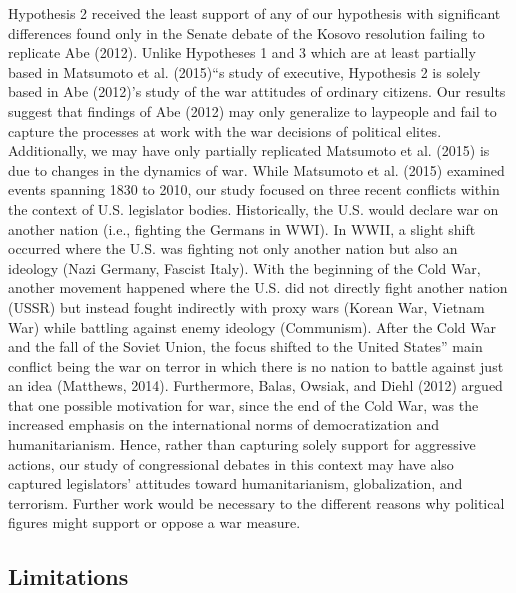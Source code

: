 \documentclass[english,,man]{apa6}
\begin{document}
Hypothesis 2 received the least support of any of our hypothesis with significant differences found only in the Senate debate of the Kosovo resolution failing to replicate Abe (2012). Unlike Hypotheses 1 and 3 which are at least partially based in Matsumoto et al. (2015)\enquote{s study of executive, Hypothesis 2 is solely based in Abe (2012)'s study of the war attitudes of ordinary citizens. Our results suggest that findings of Abe (2012) may only generalize to laypeople and fail to capture the processes at work with the war decisions of political elites.
Additionally, we may have only partially replicated Matsumoto et al. (2015) is due to changes in the dynamics of war. While Matsumoto et al. (2015) examined events spanning 1830 to 2010, our study focused on three recent conflicts within the context of U.S. legislator bodies. Historically, the U.S. would declare war on another nation (i.e., fighting the Germans in WWI). In WWII, a slight shift occurred where the U.S. was fighting not only another nation but also an ideology (Nazi Germany, Fascist Italy). With the beginning of the Cold War, another movement happened where the U.S. did not directly fight another nation (USSR) but instead fought indirectly with proxy wars (Korean War, Vietnam War) while battling against enemy ideology (Communism). After the Cold War and the fall of the Soviet Union, the focus shifted to the United States} main conflict being the war on terror in which there is no nation to battle against just an idea (Matthews, 2014). Furthermore, Balas, Owsiak, and Diehl (2012) argued that one possible motivation for war, since the end of the Cold War, was the increased emphasis on the international norms of democratization and humanitarianism. Hence, rather than capturing solely support for aggressive actions, our study of congressional debates in this context may have also captured legislators' attitudes toward humanitarianism, globalization, and terrorism. Further work would be necessary to the different reasons why political figures might support or oppose a war measure.

\hypertarget{limitations}{%
\subsection{Limitations}\label{limitations}}
\end{document}
